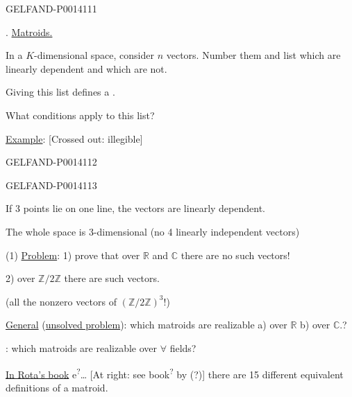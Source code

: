 \begin{GelfandAdjacentEvidence}{GELFAND-P001411}{1}

. \uline{Matroids.}

In a \(K\)-dimensional space, consider \(n\) vectors.
Number them and list which are linearly dependent and which are not.

Giving this list defines a .

What conditions apply to this list?

\uline{Example}:
[Crossed out: illegible]
\end{GelfandAdjacentEvidence}
\begin{GelfandAdjacentEvidence}{GELFAND-P001411}{2}


\end{GelfandAdjacentEvidence}
\begin{GelfandAdjacentEvidence}{GELFAND-P001411}{3}


If 3 points lie on one line, the vectors are linearly dependent.

The whole space is 3-dimensional (no 4 linearly independent vectors)

(1) \uline{Problem}: 1) prove that over \(\mathbb R\) and \(\mathbb C\)
there are no such vectors!

2) over \(\mathbb Z/2\mathbb Z\) there are such vectors.

(all the nonzero vectors of \((\mathbb Z/2\mathbb Z)^3\)!)

\uline{General} (\uline{unsolved problem}): which matroids are realizable
a) over \(\mathbb R\)
b) over \(\mathbb C\).?

: which matroids are realizable over \(\forall\) fields?

\uline{In Rota’s book} e\textsuperscript{?}\ldots
[At right: see book\textsuperscript{?} by  (?)]
there are 15 different equivalent definitions of a matroid.

\end{GelfandAdjacentEvidence}
